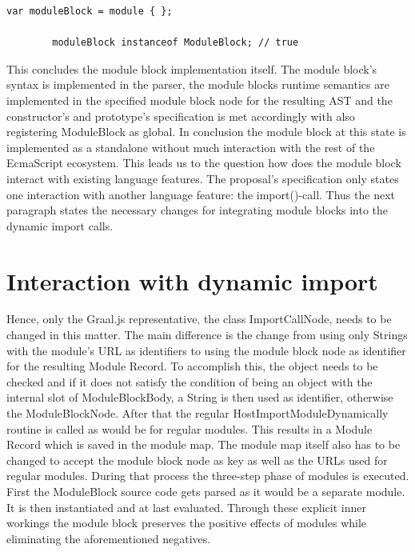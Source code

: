  \begin{lstlisting}[caption="ModuleBlock working as global in JavaScript", label="lst:impl:globModule"]
        var moduleBlock = module { };
        
        moduleBlock instanceof ModuleBlock; // true
\end{lstlisting}

This concludes the module block implementation itself. The module block's syntax is implemented in the parser, the module blocks runtime semantics are implemented in the specified module block node for the resulting AST and the constructor's and prototype's specification is met accordingly with also registering ModuleBlock as global. In conclusion the module block at this state is implemented as a standalone without much interaction with the rest of the EcmaScript ecosystem. This leads us to the question how does the module block interact with existing language features. The proposal's specification only states one interaction with another language feature: the import()-call. Thus the next paragraph states the necessary changes for integrating module blocks into the dynamic import calls.

\section{Interaction with dynamic import}

Hence, only the Graal.js representative, the class ImportCallNode, needs to be changed in this matter. The main difference is the change from using only Strings with the module's URL as identifiers to using the module block node as identifier for the resulting Module Record. To accomplish this, the object needs to be checked and if it does not satisfy the condition of being an object with the internal slot of ModuleBlockBody, a String is then used as identifier, otherwise the ModuleBlockNode. After that the regular HostImportModuleDynamically routine is called as would be for regular modules. This results in a Module Record which is saved in the module map. The module map itself also has to be changed to accept the module block node as key as well as the URLs used for regular modules. During that process the three-step phase of modules is executed. First the ModuleBlock source code gets parsed as it would be a separate module. It is then instantiated and at last evaluated. Through these explicit inner workings the module block preserves the positive effects of modules while eliminating the aforementioned negatives.\\

